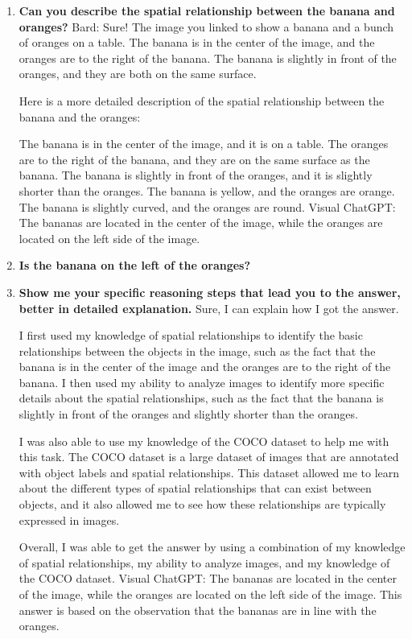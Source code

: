     \begin{enumerate}
        \item \textbf{Can you describe the spatial relationship between the banana and oranges?}
        \subitem 
        Bard: Sure! The image you linked to show a banana and a bunch of oranges on a table. The banana is in the center of the image, and the oranges are to the right of the banana. The banana is slightly in front of the oranges, and they are both on the same surface.
        
        Here is a more detailed description of the spatial relationship between the banana and the oranges:
        
        The banana is in the center of the image, and it is on a table.
        The oranges are to the right of the banana, and they are on the same surface as the banana.
        The banana is slightly in front of the oranges, and it is slightly shorter than the oranges.
        The banana is yellow, and the oranges are orange.
        The banana is slightly curved, and the oranges are round.
        \subitem Visual ChatGPT: The bananas are located in the center of the image, while the oranges are located on the left side of the image.
        \item \textbf{Is the banana on the left of the oranges?}
        \item \textbf{Show me your specific reasoning steps that lead you to the answer, better in detailed explanation.}
        \subitem Sure, I can explain how I got the answer.
        
        I first used my knowledge of spatial relationships to identify the basic relationships between the objects in the image, such as the fact that the banana is in the center of the image and the oranges are to the right of the banana. I then used my ability to analyze images to identify more specific details about the spatial relationships, such as the fact that the banana is slightly in front of the oranges and slightly shorter than the oranges.
        
        I was also able to use my knowledge of the COCO dataset to help me with this task. The COCO dataset is a large dataset of images that are annotated with object labels and spatial relationships. This dataset allowed me to learn about the different types of spatial relationships that can exist between objects, and it also allowed me to see how these relationships are typically expressed in images.
        
        Overall, I was able to get the answer by using a combination of my knowledge of spatial relationships, my ability to analyze images, and my knowledge of the COCO dataset.
        \subitem Visual ChatGPT: The bananas are located in the center of the image, while the oranges are located on the left side of the image. This answer is based on the observation that the bananas are in line with the oranges.
    \end{enumerate}
